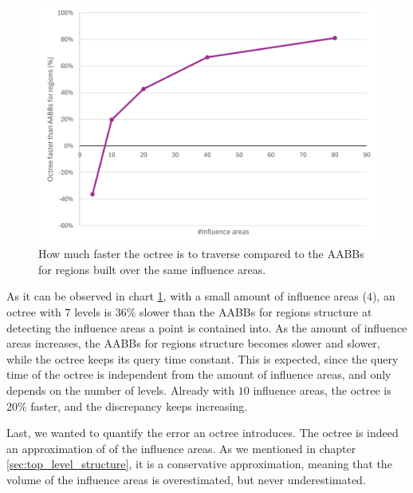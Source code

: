 \documentclass{PoliMi_MasterThesis}
\begin{document}
\begin{figure}[H] 
	\centering
	\includegraphics[width=\textwidth]{Images/octree_scaling_with_influence_areas_chart.png}
	\caption{How much faster the octree is to traverse compared to the AABBs for regions built over the same influence areas.}
	\label{fig:octree_scaling_with_influence_areas_chart}
\end{figure}

As it can be observed in chart \ref{fig:octree_scaling_with_influence_areas_chart}, with a small amount of influence areas ($4$), an octree with $7$ levels is $36\%$ slower than the AABBs for regions structure at detecting the influence areas a point is contained into. As the amount of influence areas increases, the AABBs for regions structure becomes slower and slower, while the octree keeps its query time constant. This is expected, since the query time of the octree is independent from the amount of influence areas, and only depends on the number of levels. Already with $10$ influence areas, the octree is $20\%$ faster, and the discrepancy keeps increasing. 

Last, we wanted to quantify the error an octree introduces. The octree is indeed an approximation of of the influence areas. As we mentioned in chapter \ref{sec:top_level_structure}, it is a conservative approximation, meaning that the volume of the influence areas is overestimated, but never underestimated.
\end{document}
